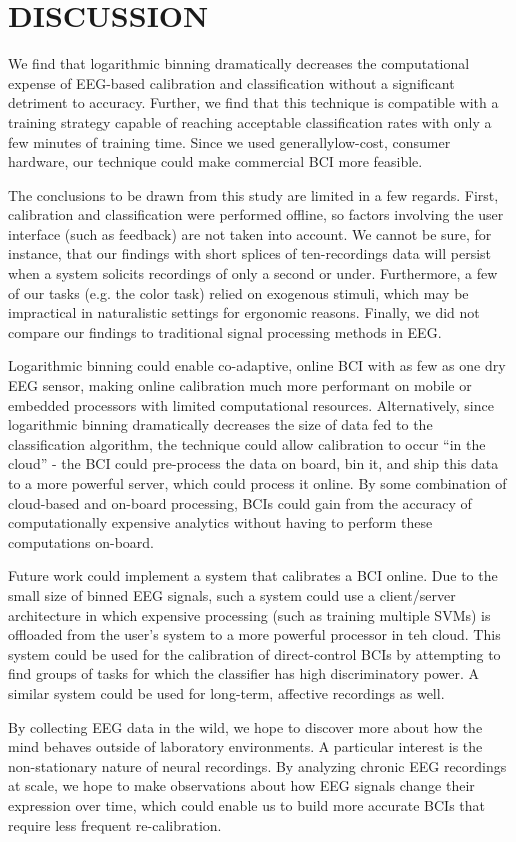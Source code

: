 \section{\uppercase{Discussion}}

\noindent We find that logarithmic binning dramatically decreases the computational expense of EEG-based calibration and classification without a significant detriment to accuracy. Further, we find that this technique is compatible with a training strategy capable of reaching acceptable classification rates with only a few minutes of training time. Since we used generallylow-cost, consumer hardware, our technique could make commercial BCI more feasible. 

The conclusions to be drawn from this study are limited in a few regards. First, calibration and classification were performed offline, so factors involving the user interface (such as feedback) are not taken into account. We cannot be sure, for instance, that our findings with short splices of ten-recordings data will persist when a system solicits recordings of only a second or under. Furthermore, a few of our tasks (e.g. the color task) relied on exogenous stimuli, which may be impractical in naturalistic settings for ergonomic reasons. Finally, we did not compare our findings to traditional signal processing methods in EEG.

Logarithmic binning could enable co-adaptive, online BCI with as few as one dry EEG sensor, making online calibration much more performant on mobile or embedded processors with limited computational resources. Alternatively, since logarithmic binning dramatically decreases the size of data fed to the classification algorithm, the technique could allow calibration to occur “in the cloud” - the BCI could pre-process the data on board, bin it, and ship this data to a more powerful server, which could process it online. By some combination of cloud-based and on-board processing, BCIs could gain from the accuracy of computationally expensive analytics without having to perform these computations on-board.

Future work could implement a system that calibrates a BCI online. Due to the small size of binned EEG signals, such a system could use a client/server architecture in which expensive processing (such as training multiple SVMs) is offloaded from the user’s system to a more powerful processor in teh cloud. This system could be used for the calibration of direct-control BCIs by attempting to find groups of tasks for which the classifier has high discriminatory power. A similar system could be used for long-term, affective recordings as well.

By collecting EEG data in the wild, we hope to discover more about how the mind behaves outside of laboratory environments. A particular interest is the non-stationary nature of neural recordings. By analyzing chronic EEG recordings at scale, we hope to make observations about how EEG signals change their expression over time, which could enable us to build more accurate BCIs that require less frequent re-calibration.